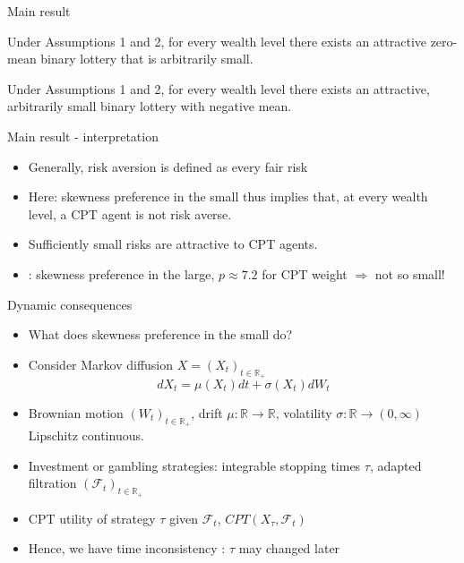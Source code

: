 \begin{frame}{Main result}
    \begin{theorem}
        Under Assumptions 1 and 2, for every wealth level there exists an attractive zero-mean binary lottery that is arbitrarily small.
	\end{theorem}

    \begin{corollary}
        Under Assumptions 1 and 2, for every wealth level there exists an attractive, arbitrarily small binary lottery with negative mean.
	\end{corollary}
\end{frame}

\begin{frame}{Main result - interpretation}
    \begin{itemize}
        \item Generally, risk aversion is defined as every fair risk\medskip
        \item Here: skewness preference in the small thus implies that, at every wealth level, a CPT agent is not risk averse.\medskip
        \item Sufficiently small risks are attractive to CPT agents.\medskip
        \item \citet{AzevedoGottlieb2012}: skewness preference in the large, $p\approx 7.2$ for CPT weight $\Rightarrow$ not so small!\medskip
	\end{itemize}
\end{frame}

\begin{frame}{Dynamic consequences}
    \begin{itemize}
        \item What does skewness preference in the small do?\medskip
        \item Consider Markov diffusion $ X= (X_t)_{t \in \mathbb{R}_+ }$
        \[dX_t = \mu(X_t)dt + \sigma (X_t)dW_t\]
        \item Brownian motion $(W_t)_{t \in \mathbb{R}_+ }$, drift $\mu:\mathbb{R} \rightarrow \mathbb{R}$, volatility $\sigma: \mathbb{R}  \rightarrow (0,\infty)$ Lipschitz continuous.\medskip
        \item Investment or gambling strategies: integrable stopping times $\tau$, adapted filtration $(\mathcal{F} _t)_{t \in \mathbb{R}_+ }$\medskip
        \item CPT utility of strategy $\tau$ given $\mathcal{F} _t$, $CPT(X_\tau,\mathcal{F}_t)$\medskip
        \item Hence, we have  time inconsistency \citep{Barberis2012a}: $\tau$ may changed later\medskip
       	\end{itemize}
\end{frame}


